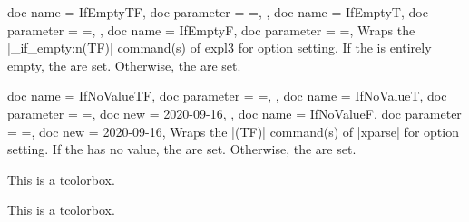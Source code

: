 \begin{docTcbKeys}[doc description = {no default}, doc new = 2022-05-25 ]
  {
    {
      doc name        = IfEmptyTF,
      doc parameter   = {=},
    },
    {
      doc name        = IfEmptyT,
      doc parameter   = {=},
    },
    {
      doc name        = IfEmptyF,
      doc parameter   = {=},
    }
  }
  Wraps the |\tl_if_empty:n(TF)| command(s) of \textsf{expl3} for option setting.
  If the  is entirely empty, the  are set.
  Otherwise, the  are set.
\end{docTcbKeys}


\clearpage

\begin{docTcbKeys}[doc description = {no default}]
  {
    {
      doc name        = IfNoValueTF,
      doc parameter   = {=},
    },
    {
      doc name        = IfNoValueT,
      doc parameter   = {=},
      doc new         = 2020-09-16,
    },
    {
      doc name        = IfNoValueF,
      doc parameter   = {=},
      doc new         = 2020-09-16,
    }
  }
  Wraps the |\IfNoValue(TF)| command(s) of |xparse| for option setting.
  If the  has no value, the  are set.
  Otherwise, the  are set.
\begin{dispExample}

\begin{mybox}
This is a tcolorbox.
\end{mybox}

\begin{mybox}
This is a tcolorbox.
\end{mybox}
\end{dispExample}
\end{docTcbKeys}

